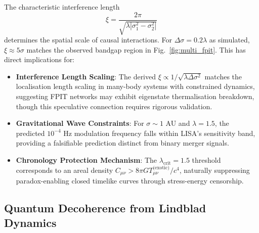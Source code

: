\documentclass[twocolumn]{article}
\begin{document}
	The characteristic interference length 
	\begin{equation}
		\xi = \frac{2\pi}{\sqrt{\lambda|\sigma_1^2 - \sigma_2^2|}}
	\end{equation} 
	determines the spatial scale of causal interactions. For $\Delta\sigma = 0.2\lambda$ as simulated, $\xi \approx 5\sigma$ matches the observed bandgap region in Fig.~\ref{fig:multi_fpit}. This has direct implications for:
	
	\begin{itemize}
		\item \textbf{Interference Length Scaling}: The derived $\xi \propto 1/\sqrt{\lambda\Delta\sigma^2}$ matches the localisation length scaling in many-body systems with constrained dynamics\cite{Huse2014}, suggesting FPIT networks may exhibit eigenstate thermalisation breakdown, though this speculative connection requires rigorous validation.
		
		\item \textbf{Gravitational Wave Constraints}: For $\sigma \sim 1$ AU and $\lambda=1.5$, the predicted $10^{-4}$ Hz modulation frequency falls within LISA's sensitivity band\cite{lisa2023}, providing a falsifiable prediction distinct from binary merger signals.
		
		\item \textbf{Chronology Protection Mechanism}: The $\lambda_{\text{crit}}=1.5$ threshold corresponds to an areal density $C_{\mu\nu} > 8\pi G T_{\mu\nu}^{\text{(exotic)}}/c^4$, naturally suppressing paradox-enabling closed timelike curves through stress-energy censorship.
	\end{itemize}
	
	\subsection{Quantum Decoherence from Lindblad Dynamics}\label{subsec:decoherence}
	
\end{document}
